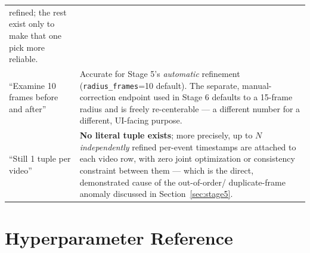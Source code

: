 \documentclass[11pt]{article}
\newcommand{\code}[1]{\texttt{\small #1}}
\newcommand{\corr}[1]{\textbf{\textcolor{red!60!black}{#1}}}
\begin{document}
\begin{longtable}{@{}p{}p{}@{}}
  refined; the rest exist only to make that one pick more reliable. \\[4pt]
``Examine 10 frames before and after'' &
  Accurate for Stage 5's \emph{automatic} refinement
  (\code{radius\_frames}=10 default). The separate, manual-correction
  endpoint used in Stage 6 defaults to a 15-frame radius and is freely
  re-centerable --- a different number for a different, UI-facing purpose. \\[4pt]
``Still 1 tuple per video'' &
  \corr{No literal tuple exists}; more precisely, up to $N$
  \emph{independently} refined per-event timestamps are attached to each
  video row, with zero joint optimization or consistency constraint between
  them --- which is the direct, demonstrated cause of the out-of-order/
  duplicate-frame anomaly discussed in Section~\ref{sec:stage5}. \\
\bottomrule
\end{longtable}

\section{Hyperparameter Reference}
\end{document}

